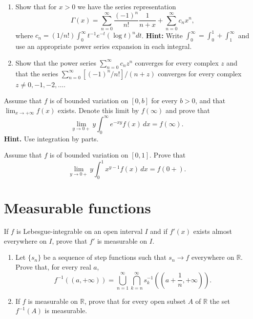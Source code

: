 \begin{problembox}
\begin{enumerate}[label=(\alph*)]
    \item Show that for $x > 0$ we have the series representation
    \[\Gamma(x) = \sum_{n=0}^{\infty} \frac{(-1)^n}{n!} \frac{1}{n + x} + \sum_{n=0}^{\infty} c_n x^n,\]
    where $c_n = (1/n!) \int_0^\infty t^{-1} e^{-t} (\log t)^n dt$. \textbf{Hint:} Write $\int_0^\infty = \int_0^1 + \int_1^\infty$ and use an appropriate power series expansion in each integral.
    \item Show that the power series $\sum_{n=0}^{\infty} c_n z^n$ converges for every complex $z$ and that the series $\sum_{n=0}^{\infty} [(-1)^n / n!]/(n + z)$ converges for every complex $z \neq 0, -1, -2, \ldots$.
\end{enumerate}
\end{problembox}

\begin{problembox}
Assume that $f$ is of bounded variation on $[0, b]$ for every $b > 0$, and that $\lim_{x \to +\infty} f(x)$ exists. Denote this limit by $f(\infty)$ and prove that
\[\lim_{y \to 0+} y \int_0^\infty e^{-xy}f(x) \, dx = f(\infty).\]
\textbf{Hint.} Use integration by parts.
\end{problembox}

\begin{problembox}
Assume that $f$ is of bounded variation on $[0, 1]$. Prove that
\[\lim_{y \to 0+} y \int_0^1 x^{y-1}f(x) \, dx = f(0+).\]
\end{problembox}

\section{Measurable functions}

\begin{problembox}
If $f$ is Lebesgue-integrable on an open interval $I$ and if $f'(x)$ exists almost everywhere on $I$, prove that $f'$ is measurable on $I$.
\end{problembox}

\begin{problembox}
\begin{enumerate}[label=(\alph*)]
    \item Let $\{s_n\}$ be a sequence of step functions such that $s_n \to f$ everywhere on $\mathbb{R}$. Prove that, for every real $a$,
    \[f^{-1}((a, +\infty)) = \bigcup_{n=1}^\infty \bigcap_{k=n}^\infty s_k^{-1} \left( \left( a + \frac{1}{n}, +\infty \right) \right).\]
    \item If $f$ is measurable on $\mathbb{R}$, prove that for every open subset $A$ of $\mathbb{R}$ the set $f^{-1}(A)$ is measurable.
\end{enumerate}
\end{problembox}


